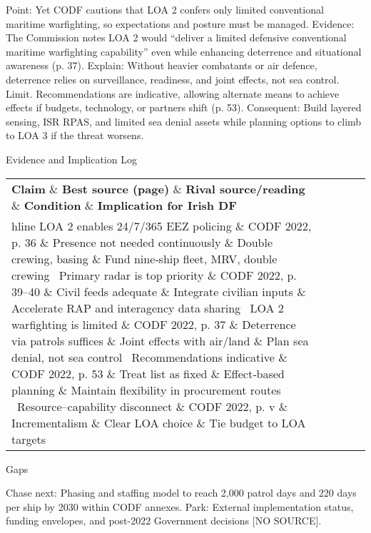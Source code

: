 Point: Yet CODF cautions that LOA 2 confers only limited conventional maritime warfighting, so expectations and posture must be managed.
Evidence: The Commission notes LOA 2 would “deliver a limited defensive conventional maritime warfighting capability” even while enhancing deterrence and situational awareness (p. 37).
Explain: Without heavier combatants or air defence, deterrence relies on surveillance, readiness, and joint effects, not sea control.
Limit. Recommendations are indicative, allowing alternate means to achieve effects if budgets, technology, or partners shift (p. 53).
Consequent: Build layered sensing, ISR RPAS, and limited sea denial assets while planning options to climb to LOA 3 if the threat worsens.

Evidence and Implication Log

\begin{tabular}{p{3.2cm}p{4.2cm}p{3.6cm}p{3.2cm}p{4.2cm}}
	\textbf{Claim} \& \textbf{Best source (page)} \& \textbf{Rival source/reading} \& \textbf{Condition} \& \textbf{Implication for Irish DF}\\hline
	LOA 2 enables 24/7/365 EEZ policing \& CODF 2022, p. 36 \& Presence not needed continuously \& Double crewing, basing \& Fund nine‐ship fleet, MRV, double crewing \
	Primary radar is top priority \& CODF 2022, p. 39–40 \& Civil feeds adequate \& Integrate civilian inputs \& Accelerate RAP and interagency data sharing \
	LOA 2 warfighting is limited \& CODF 2022, p. 37 \& Deterrence via patrols suffices \& Joint effects with air/land \& Plan sea denial, not sea control \
	Recommendations indicative \& CODF 2022, p. 53 \& Treat list as fixed \& Effect‐based planning \& Maintain flexibility in procurement routes \
	Resource–capability disconnect \& CODF 2022, p. v \& Incrementalism \& Clear LOA choice \& Tie budget to LOA targets \
\end{tabular}

Gaps

Chase next: Phasing and staffing model to reach 2,000 patrol days and 220 days per ship by 2030 within CODF annexes.
Park: External implementation status, funding envelopes, and post-2022 Government decisions [NO SOURCE].

\parencite{COHEN_2002}

